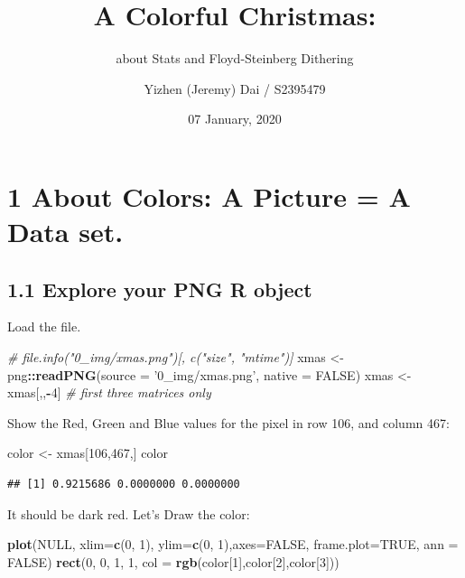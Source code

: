 \documentclass[]{article}
\title{A Colorful Christmas:}
\subtitle{about Stats and Floyd-Steinberg Dithering}
\author{Yizhen (Jeremy) Dai / S2395479}
\date{07 January, 2020}
\newenvironment{Shaded}{\begin{snugshade}}{\end{snugshade}}
\newcommand{\CommentTok}[1]{\textcolor[rgb]{0.56,0.35,0.01}{\textit{#1}}}
\newcommand{\DataTypeTok}[1]{\textcolor[rgb]{0.13,0.29,0.53}{#1}}
\newcommand{\DecValTok}[1]{\textcolor[rgb]{0.00,0.00,0.81}{#1}}
\newcommand{\KeywordTok}[1]{\textcolor[rgb]{0.13,0.29,0.53}{\textbf{#1}}}
\newcommand{\NormalTok}[1]{#1}
\newcommand{\OperatorTok}[1]{\textcolor[rgb]{0.81,0.36,0.00}{\textbf{#1}}}
\newcommand{\OtherTok}[1]{\textcolor[rgb]{0.56,0.35,0.01}{#1}}
\newcommand{\StringTok}[1]{\textcolor[rgb]{0.31,0.60,0.02}{#1}}
\begin{document}
\maketitle

\hypertarget{about-colors-a-picture-a-data-set.}{%
\section{1 About Colors: A Picture = A Data
set.}\label{about-colors-a-picture-a-data-set.}}

\hypertarget{explore-your-png-r-object}{%
\subsection{1.1 Explore your PNG R
object}\label{explore-your-png-r-object}}

Load the file.

\begin{Shaded}
\begin{Highlighting}[]
\CommentTok{# file.info("0_img/xmas.png")[, c("size", "mtime")]}
\NormalTok{xmas <-}\StringTok{ }\NormalTok{png}\OperatorTok{::}\KeywordTok{readPNG}\NormalTok{(}\DataTypeTok{source =} \StringTok{'0_img/xmas.png'}\NormalTok{, }\DataTypeTok{native =} \OtherTok{FALSE}\NormalTok{)}
\NormalTok{xmas <-}\StringTok{ }\NormalTok{xmas[,,}\OperatorTok{-}\DecValTok{4}\NormalTok{] }\CommentTok{# first three matrices only}
\end{Highlighting}
\end{Shaded}

Show the Red, Green and Blue values for the pixel in row 106, and column
467:

\begin{Shaded}
\begin{Highlighting}[]
\NormalTok{color <-}\StringTok{ }\NormalTok{xmas[}\DecValTok{106}\NormalTok{,}\DecValTok{467}\NormalTok{,]}
\NormalTok{color}
\end{Highlighting}
\end{Shaded}

\begin{verbatim}
## [1] 0.9215686 0.0000000 0.0000000
\end{verbatim}

It should be dark red. Let's Draw the color:

\begin{Shaded}
\begin{Highlighting}[]
\KeywordTok{plot}\NormalTok{(}\OtherTok{NULL}\NormalTok{, }\DataTypeTok{xlim=}\KeywordTok{c}\NormalTok{(}\DecValTok{0}\NormalTok{, }\DecValTok{1}\NormalTok{), }\DataTypeTok{ylim=}\KeywordTok{c}\NormalTok{(}\DecValTok{0}\NormalTok{, }\DecValTok{1}\NormalTok{),}\DataTypeTok{axes=}\OtherTok{FALSE}\NormalTok{, }\DataTypeTok{frame.plot=}\OtherTok{TRUE}\NormalTok{, }\DataTypeTok{ann =} \OtherTok{FALSE}\NormalTok{)}
\KeywordTok{rect}\NormalTok{(}\DecValTok{0}\NormalTok{, }\DecValTok{0}\NormalTok{, }\DecValTok{1}\NormalTok{, }\DecValTok{1}\NormalTok{, }\DataTypeTok{col =} \KeywordTok{rgb}\NormalTok{(color[}\DecValTok{1}\NormalTok{],color[}\DecValTok{2}\NormalTok{],color[}\DecValTok{3}\NormalTok{]))}
\end{Highlighting}
\end{Shaded}
\end{document}
